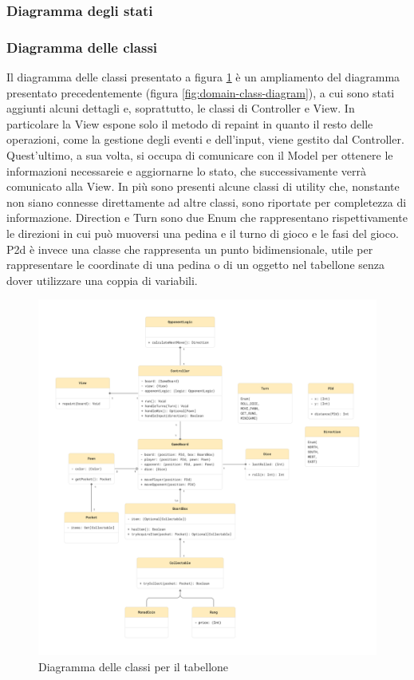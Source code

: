 \subsubsection{Diagramma degli stati} \label{sec:design-choices:state-diagram}

\subsubsection{Diagramma delle classi} \label{sec:design-choices:class-diagram}
Il diagramma delle classi presentato a figura \ref{fig:class-diagram} è un ampliamento del diagramma presentato precedentemente
(figura \ref{fig:domain-class-diagram}), a cui sono stati aggiunti alcuni dettagli e, soprattutto, le classi di Controller e View.
In particolare la View espone solo il metodo di repaint in quanto il resto delle operazioni, come la gestione degli eventi e dell'input,
viene gestito dal Controller. Quest'ultimo, a sua volta, si occupa di comunicare con il Model per ottenere le informazioni necessareie
e aggiornarne lo stato, che successivamente verrà comunicato alla View. In più sono presenti alcune classi di utility che, nonstante
non siano connesse direttamente ad altre classi, sono riportate per completezza di informazione. Direction e Turn sono due Enum che
rappresentano rispettivamente le direzioni in cui può muoversi una pedina e il turno di gioco e le fasi del gioco. P2d è invece una classe
che rappresenta un punto bidimensionale, utile per rappresentare le coordinate di una pedina o di un oggetto nel tabellone senza 
dover utilizzare una coppia di variabili.
\begin{figure}[ht!]
    \centering
    \includegraphics[width=\textwidth]{figures/ClassDiagram_ScalaParty.png}
    \caption{Diagramma delle classi per il tabellone}
    \label{fig:class-diagram}
\end{figure}
